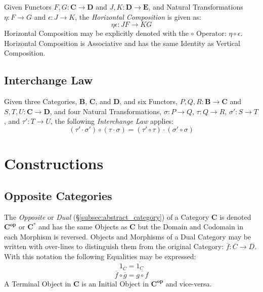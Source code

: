 Given Functors $F,G : \mathbf{C} \rightarrow \mathbf{D}$ and $J,K :
\mathbf{D} \rightarrow \mathbf{E}$, and Natural Transformations $\eta
: F \rightarrow G$ and $\epsilon : J \rightarrow K$, the
\emph{Horizontal Composition} is given as:
\[
    \eta \epsilon : JF \rightarrow KG
\]
Horizontal Composition may be explicitly denoted with the $\circ$
Operator: $\eta \circ \epsilon$. Horizontal Composition is Associative
and has the same Identity as Vertical Composition.



\subsection{Interchange Law}\label{subsec:interchange_law}

Given three Categories, $\mathbf{B}$, $\mathbf{C}$, and $\mathbf{D}$,
and six Functors, $P,Q,R : \mathbf{B} \rightarrow \mathbf{C}$ and
$S,T,U : \mathbf{C} \rightarrow \mathbf{D}$, and four Natural
Transformations, $\sigma : P \rightarrow Q$, $\tau : Q \rightarrow R$,
$\sigma' : S \rightarrow T$, and $\tau' : T \rightarrow U$, the
following \emph{Interchange Law} applies:
\[
    (\tau' \cdot \sigma') \circ (\tau \cdot \sigma) =
    (\tau' \circ \tau) \cdot (\sigma' \circ \sigma)
\]



\section{Constructions}\label{sec:category_construction}

\subsection{Opposite Categories}\label{subsec:opposite_category}

The \emph{Opposite} or \emph{Dual} (\S\ref{subsec:abstract_category})
of a Category $\mathbf{C}$ is denoted $\mathbf{C^{op}}$ or
$\mathbf{C^*}$ and has the same Objects as $\mathbf{C}$ but the Domain
and Codomain in each Morphism is reversed. Objects and Morphisms of a
Dual Category may be written with over-lines to distinguish them from
the original Category: $\overline{f}: \overline{C} \rightarrow
\overline{D}$. With this notation the following Equalities may be
expressed:
\[
    1_{\overline{C}} = \overline{1_C}
\]\[
    \overline{f} \circ \overline{g} = \overline{g \circ f}
\]
A Terminal Object in $\mathbf{C}$ is an Initial Object in
$\mathbf{C^{op}}$ and vice-versa.


